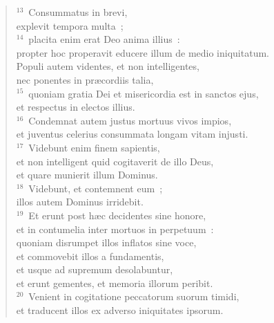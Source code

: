 \begin{flushleft}
\begin{verse}
${}^{13}$~Consummatus in brevi,\\ explevit tempora multa~;\\
${}^{14}$~placita enim erat Deo anima illius~:\\ propter hoc properavit educere illum de medio iniquitatum.\\ Populi autem videntes, et non intelligentes,\\ nec ponentes in pr\ae cordiis talia,\\
${}^{15}$~quoniam gratia Dei et misericordia est in sanctos ejus,\\ et respectus in electos illius.\\
${}^{16}$~Condemnat autem justus mortuus vivos impios,\\ et juventus celerius consummata longam vitam injusti.\\
${}^{17}$~Videbunt enim finem sapientis,\\ et non intelligent quid cogitaverit de illo Deus,\\ et quare munierit illum Dominus.\\
${}^{18}$~Videbunt, et contemnent eum~;\\ illos autem Dominus irridebit.\\
${}^{19}$~Et erunt post h\ae c decidentes sine honore,\\ et in contumelia inter mortuos in perpetuum~:\\ quoniam disrumpet illos inflatos sine voce,\\ et commovebit illos a fundamentis,\\ et usque ad supremum desolabuntur,\\ et erunt gementes, et memoria illorum peribit.\\
${}^{20}$~Venient in cogitatione peccatorum suorum timidi,\\ et traducent illos ex adverso iniquitates ipsorum.\end{verse}\end{flushleft}


